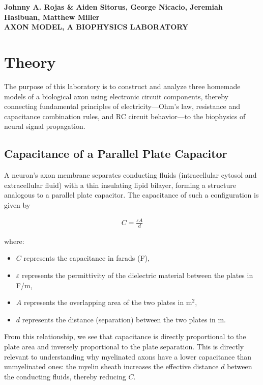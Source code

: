 \message{ !name(lab_report.tex)}\documentclass[12pt]{article}
\begin{document}


\begin{center}
    {\textbf{Johnny A. Rojas \& Aiden Sitorus, George Nicacio, Jeremiah
        Hasibuan, Matthew Miller}}\\
    {\Large \textbf{AXON MODEL, A BIOPHYSICS LABORATORY}}
\end{center}

\section{Theory}

The purpose of this laboratory is to construct and analyze three homemade models
of a biological axon using electronic circuit components, thereby connecting
fundamental principles of electricity---Ohm's law, resistance and capacitance
combination rules, and RC circuit behavior---to the biophysics of neural signal
propagation.

\subsection{Capacitance of a Parallel Plate Capacitor}

A neuron's axon membrane separates conducting fluids (intracellular cytosol and
extracellular fluid) with a thin insulating lipid bilayer, forming a structure
analogous to a parallel plate capacitor. The capacitance of such a configuration
is given by

\begin{align*}
    C = \frac{\varepsilon A}{d}
\end{align*}

where:
\begin{itemize}
  \item $C$ represents the capacitance in farads (F),
  \item $\varepsilon$ represents the permittivity of the dielectric material
        between the plates in F/m,
  \item $A$ represents the overlapping area of the two plates in m$^{2}$,
  \item $d$ represents the distance (separation) between the two plates in m.
\end{itemize}

From this relationship, we see that capacitance is directly proportional to the plate area and inversely proportional to the plate separation. This is directly relevant to understanding why myelinated axons have a lower capacitance than unmyelinated ones: the myelin sheath increases the effective distance $d$ between the conducting fluids, thereby reducing $C$.
\end{document}
